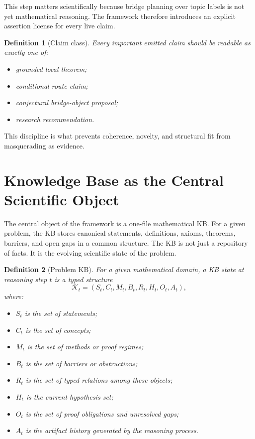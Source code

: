 \documentclass[11pt]{article}
\newtheorem{definition}{Definition}
\begin{document}
This step matters scientifically because bridge planning over topic labels is not yet mathematical reasoning. The framework therefore introduces an explicit assertion license for every live claim.

\begin{definition}[Claim class]
Every important emitted claim should be readable as exactly one of:
\begin{itemize}[leftmargin=*,itemsep=0.2em]
\item grounded local theorem;
\item conditional route claim;
\item conjectural bridge-object proposal;
\item research recommendation.
\end{itemize}
\end{definition}

This discipline is what prevents coherence, novelty, and structural fit from masquerading as evidence.

\section{Knowledge Base as the Central Scientific Object}

The central object of the framework is a one-file mathematical KB. For a given problem, the KB stores canonical statements, definitions, axioms, theorems, barriers, and open gaps in a common structure. The KB is not just a repository of facts. It is the evolving scientific state of the problem.

\begin{definition}[Problem KB]
For a given mathematical domain, a KB state at reasoning step $t$ is a typed structure
\[
\mathcal{K}_t = (S_t, C_t, M_t, B_t, R_t, H_t, O_t, A_t),
\]
where:
\begin{itemize}[leftmargin=*,itemsep=0.2em]
\item $S_t$ is the set of statements;
\item $C_t$ is the set of concepts;
\item $M_t$ is the set of methods or proof regimes;
\item $B_t$ is the set of barriers or obstructions;
\item $R_t$ is the set of typed relations among these objects;
\item $H_t$ is the current hypothesis set;
\item $O_t$ is the set of proof obligations and unresolved gaps;
\item $A_t$ is the artifact history generated by the reasoning process.
\end{itemize}
\end{definition}
\end{document}
